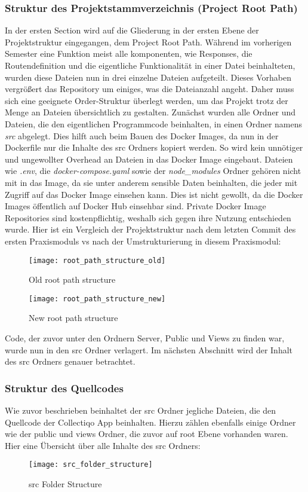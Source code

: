 \subsubsection{Struktur des Projektstammverzeichnis (Project Root Path)}
In der ersten Section wird auf die Gliederung in der ersten Ebene der Projektstruktur eingegangen, dem Project Root Path.
Während im vorherigen Semester eine Funktion meist alle komponenten, wie Responses, die Routendefinition und die eigentliche Funktionalität in einer Datei beinhalteten, wurden diese Dateien nun in drei einzelne Dateien aufgeteilt.
Dieses Vorhaben vergrößert das Repository um einiges, was die Dateianzahl angeht.
Daher muss sich eine geeignete Order-Struktur überlegt werden, um das Projekt trotz der Menge an Dateien übersichtlich zu gestalten.
Zunächst wurden alle Ordner und Dateien, die den eigentlichen Programmcode beinhalten, in einen Ordner namens \textit{src} abgelegt.
Dies hilft auch beim Bauen des Docker Images, da nun in der Dockerfile nur die Inhalte des src Ordners kopiert werden.
So wird kein unnötiger und ungewollter Overhead an Dateien in das Docker Image eingebaut.
Dateien wie \textit{.env}, die \textit{docker-compose.yaml} sowie der \textit{node_modules} Ordner gehören nicht mit in das Image, da sie unter anderem sensible Daten beinhalten, die jeder mit Zugriff auf das Docker Image einsehen kann.
Dies ist nicht gewollt, da die Docker Images öffentlich auf Docker Hub einsehbar sind.
Private Docker Image Repositories sind kostenpflichtig, weshalb sich gegen ihre Nutzung entschieden wurde.
Hier ist ein Vergleich der Projektstruktur nach dem letzten Commit des ersten Praxismoduls vs nach der Umstrukturierung in diesem Praxismodul:
\begin{figure}[h]
  \centering
  \texttt{[image: root\_path\_structure\_old]}
  \caption{Old root path structure}
  \label{fig:root_path_structure_old}
\end{figure}
\begin{figure}[h]
  \centering
  \texttt{[image: root\_path\_structure\_new]}
  \caption{New root path structure}
  \label{fig:root_path_strucutr_new}
\end{figure}
Code, der zuvor unter den Ordnern Server, Public und Views zu finden war, wurde nun in den src Ordner verlagert.
Im nächsten Abschnitt wird der Inhalt des src Ordners genauer betrachtet.

\subsubsection{Struktur des Quellcodes}
Wie zuvor beschrieben beinhaltet der src Ordner jegliche Dateien, die den Quellcode der Collectiqo App beinhalten.
Hierzu zählen ebenfalls einige Ordner wie der public und views Ordner, die zuvor auf root Ebene vorhanden waren.
Hier eine Übersicht über alle Inhalte des src Ordners:
\begin{figure}[h]
  \centering
  \texttt{[image: src\_folder\_structure]}
  \caption{src Folder Structure}
  \label{fig:src_folder_structure}
\end{figure}


